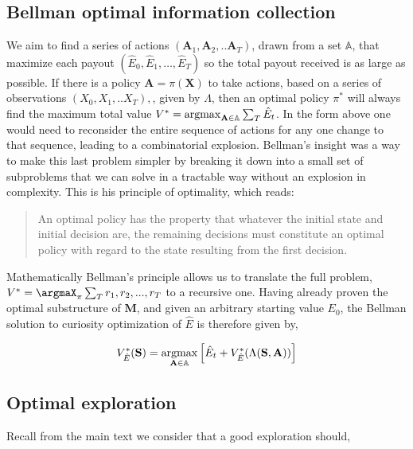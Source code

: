 \subsection*{Bellman optimal information collection}
We aim to find a series of actions $(\mathbf{A}_1, \mathbf{A}_2, ..\mathbf{A}_T)$, drawn from a set $\mathbb{A}$, that maximize each payout $(\hat E_0, \hat E_1, \ldots, \hat E_{T})$ so the total payout received is as large as possible. If there is a policy $\mathbf{A} = \pi(\mathbf{X})$ to take actions, based on a series of observations $(X_0, X_1, ..X_{T}),$, given by $\Lambda$, then an optimal policy $\pi^*$ will always find the maximum total value $V^* = \operatorname*{argmax}_{\mathbf{A} \in \mathbb{A}} \sum_T \hat E_t $. In the form above one would need to reconsider the entire sequence of actions for any one change to that sequence, leading to a combinatorial explosion. Bellman's insight was a way to make this last problem simpler by breaking it down into a small set of subproblems that we can solve in a tractable way without an explosion in complexity. This is his principle of optimality, which reads:

\begin{quote}
    An optimal policy has the property that whatever the initial state and initial decision are, the remaining decisions must constitute an optimal policy with regard to the state resulting from the first decision. \cite{Bellmann1954}
\end{quote}

Mathematically Bellman's principle allows us to translate the full problem, $V^* = \argmaX_{\pi} \sum_T r_1, r_2, ..., r_{T}$ to a recursive one. Having already proven the optimal substructure of $\mathbf{M}$, and given an arbitrary starting value $E_0$, the Bellman solution to curiosity optimization of $\hat E$ is therefore given by,

\begin{equation} 
	\label{eq:bellman_iter_E_app}
	V^*_{\hat E}(\mathbf{S}) = \operatorname*{argmax}_{\mathbf{A} \in \mathbb{A}} \Big [ \hat E_{t}  + V^*_{\hat E}(\Lambda(\mathbf{S},\mathbf{A})) \Big ]
\end{equation}


\subsection*{Optimal exploration} 

Recall from the main text we consider that a good exploration should,

